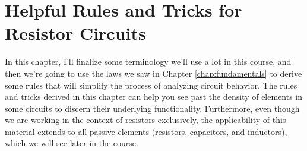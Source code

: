 \chapter{Helpful Rules and Tricks for Resistor Circuits}
\label{chap:resistorRulesAndTricks}
In this chapter, I'll finalize some terminology we'll use a lot in this course, and then we're going to use the laws we saw in Chapter \ref{chap:fundamentals} to derive some rules that will simplify the process of analyzing circuit behavior. The rules and tricks derived in this chapter can help you see past the density of elements in some circuits to discern their underlying functionality. Furthermore, even though we are working in the context of resistors exclusively, the applicability of this material extends to all passive elements (resistors, capacitors, and inductors), which we will see later in the course.
 

